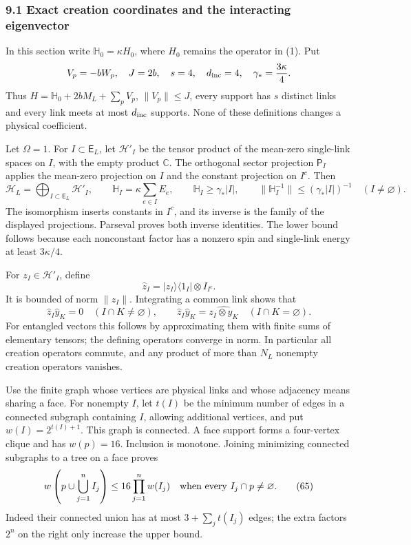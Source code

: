 \documentclass[
  11pt,
]{article}
\begin{document}
\subsubsection{9.1 Exact creation coordinates and the interacting
eigenvector}\label{exact-creation-coordinates-and-the-interacting-eigenvector}

In this section write \(\mathbb H_0=\kappa H_0\), where \(H_0\) remains
the operator in (1). Put \[
 V_p=-bW_p,\quad J=2b,\quad s=4,\quad d_{\rm inc}=4,\quad
 \gamma_*=\frac{3\kappa}{4}.
\] Thus \(H=\mathbb H_0+2bM_L+\sum_pV_p\), \(\|V_p\|\le J\), every
support has \(s\) distinct links and every link meets at most
\(d_{\rm inc}\) supports. None of these definitions changes a physical
coefficient.

Let \(\Omega=1\). For \(I\subset\mathsf E_L\), let \(\mathcal H'_I\) be
the tensor product of the mean-zero single-link spaces on \(I\), with
the empty product \(\mathbb C\). The orthogonal sector projection
\(\mathsf P_I\) applies the mean-zero projection on \(I\) and the
constant projection on \(I^c\). Then \[
 \mathcal H_L=\bigoplus_{I\subset\mathsf E_L}\mathcal H'_I,\qquad
 \mathbb H_I=\kappa\sum_{e\in I}E_e,\qquad
 \mathbb H_I\ge\gamma_*|I|,\qquad
 \|\mathbb H_I^{-1}\|\le(\gamma_*|I|)^{-1}\quad(I\ne\varnothing).
 \tag{63}
\] The isomorphism inserts constants in \(I^c\), and its inverse is the
family of the displayed projections. Parseval proves both inverse
identities. The lower bound follows because each nonconstant factor has
a nonzero spin and single-link energy at least \(3\kappa/4\).

For \(z_I\in\mathcal H'_I\), define \[
 \widehat z_I=|z_I\rangle\langle1_I|\otimes I_{I^c}.
\] It is bounded of norm \(\|z_I\|\). Integrating a common link shows
that \[
 \widehat z_I\widehat y_K=0\quad(I\cap K\ne\varnothing),
 \qquad
 \widehat z_I\widehat y_K=\widehat{z_I\otimes y_K}
       \quad(I\cap K=\varnothing).
 \tag{64}
\] For entangled vectors this follows by approximating them with finite
sums of elementary tensors; the defining operators converge in norm. In
particular all creation operators commute, and any product of more than
\(N_L\) nonempty creation operators vanishes.

Use the finite graph whose vertices are physical links and whose
adjacency means sharing a face. For nonempty \(I\), let \(t(I)\) be the
minimum number of edges in a connected subgraph containing \(I\),
allowing additional vertices, and put \(w(I)=2^{t(I)+1}\). This graph is
connected. A face support forms a four-vertex clique and has
\(w(p)=16\). Inclusion is monotone. Joining minimizing connected
subgraphs to a tree on a face proves \[
 w\left(p\cup\bigcup_{j=1}^n I_j\right)
 \le16\prod_{j=1}^n w(I_j)\quad\hbox{when every }I_j\cap p\ne\varnothing.
 \tag{65}
\] Indeed their connected union has at most \(3+\sum_jt(I_j)\) edges;
the extra factors \(2^n\) on the right only increase the upper bound.
\end{document}
